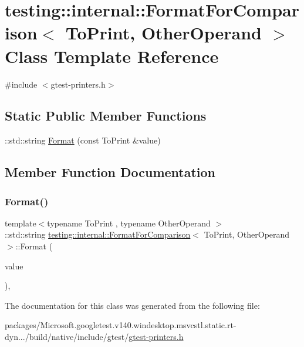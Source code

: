 \hypertarget{classtesting_1_1internal_1_1_format_for_comparison}{}\section{testing\+::internal\+::Format\+For\+Comparison$<$ To\+Print, Other\+Operand $>$ Class Template Reference}
\label{classtesting_1_1internal_1_1_format_for_comparison}


{\ttfamily \#include $<$gtest-\/printers.\+h$>$}

\subsection*{Static Public Member Functions}
\begin{DoxyCompactItemize}
\item 
\+::std\+::string \mbox{\hyperlink{classtesting_1_1internal_1_1_format_for_comparison_a2aeb688fc55b57abd3021d82eccad896}{Format}} (const To\+Print \&value)
\end{DoxyCompactItemize}


\subsection{Member Function Documentation}
\mbox{\label{classtesting_1_1internal_1_1_format_for_comparison_a2aeb688fc55b57abd3021d82eccad896}} 
\subsubsection{\texorpdfstring{Format()}{Format()}}
{\footnotesize\ttfamily template$<$typename To\+Print , typename Other\+Operand $>$ \\
\+::std\+::string \mbox{\hyperlink{classtesting_1_1internal_1_1_format_for_comparison}{testing\+::internal\+::\+Format\+For\+Comparison}}$<$ To\+Print, Other\+Operand $>$\+::Format (\begin{DoxyParamCaption}\item[{const To\+Print \&}]{value }\end{DoxyParamCaption})\hspace{0.3cm}{\ttfamily [inline]}, {\ttfamily [static]}}



The documentation for this class was generated from the following file\+:\begin{DoxyCompactItemize}
\item 
packages/\+Microsoft.\+googletest.\+v140.\+windesktop.\+msvcstl.\+static.\+rt-\/dyn.../build/native/include/gtest/\mbox{\hyperlink{gtest-printers_8h}{gtest-\/printers.\+h}}\end{DoxyCompactItemize}
